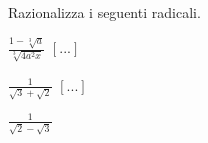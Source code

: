\newpage

\begin{esercizio}
 \label{ese:2.72}
Razionalizza i seguenti radicali.
 \begin{multicols}{4}
 \begin{enumeratea}
 \item $\frac{1-\sqrt[3]a}{\sqrt[3]{4a^2x}}$
  \hfill $\left[...\right]$
 \item $\frac 1{\sqrt 3+\sqrt 2}$
  \hfill $\left[...\right]$
 \item $\frac 1{\sqrt 2-\sqrt 3}$

\end{enumeratea}
\end{multicols}
\end{esercizio}
